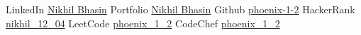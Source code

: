 

\begin{cvskills}
  \cvskill
    {LinkedIn} %
    {\href{https://www.linkedin.com/in/nikhil1204/}{Nikhil Bhasin}}
    \cvskill
    {Portfolio} %
   {\href{https://nikhil-bhasin.netlify.app/}{Nikhil Bhasin}}
  \cvskill
    {Github} %
    {\href{https://github.com/phoenix-1-2}{phoenix-1-2}}
  \cvskill
    {HackerRank} %
    {\href{https://www.hackerrank.com/nikhil_12_04}{nikhil\_12\_04}}
  \cvskill
    {LeetCode} %
    {\href{https://leetcode.com/phoenix_1_2/}{phoenix\_1\_2}}
  \cvskill
    {CodeChef} %
    {\href{https://www.codechef.com/users/phoenix_1_2}{phoenix\_1\_2}}
\end{cvskills}
